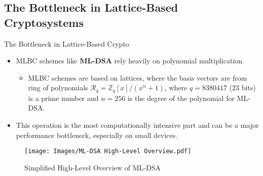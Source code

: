 \documentclass[
	10pt, t,
	hyperref={
		colorlinks,
		citecolor=CtpLatteTeal,
		linkcolor=CtpLatteTeal,
		urlcolor=CtpLatteBlue,
		pdfauthor={Bardia Taghavi},
		pdftitle={LightNTT: A Tiny NTT/iNTT Core for ML-DSA Featuring a Constant-Geometry Pipelined Design},
		pdfsubject={Cryptography},
		pdfkeywords={NTT, iNTT, ML-DSA, Constant-Geometry Pipelined Design},
		pdfcreator={Bardia Taghavi},
		pdfproducer={Bardia Taghavi}
		},
	aspectratio=1610,
	]
	{beamer}
\begin{document}
\subsection{The Bottleneck in Lattice-Based Cryptosystems}
\begin{frame}{The Bottleneck in Lattice-Based Crypto}
	\begin{itemize}\setlength{\itemsep}{2ex}
		\item MLBC schemes like \textbf{ML-DSA} rely heavily on polynomial multiplication.
		\begin{itemize}\vspace{1ex}
			\item MLBC schemes are based on lattices, where the basis vectors are from ring of polynomials $\mathcal{R}_q = \mathbb{Z}_q[x]/(x^n+1)$, where $q = 8380417$ (23 bits) is a prime number and $n = 256$ is the degree of the polynomial for ML-DSA.
		\end{itemize}
		\item This operation is the most computationally intensive part and can be a major performance bottleneck, especially on small devices.

	\end{itemize}
	\begin{figure}
		\texttt{[image: Images/ML-DSA High-Level Overview.pdf]}
		\caption{\textcolor<-1>{FadeOverlay}{Simplified High-Level Overview of ML-DSA}}
	\end{figure}
\end{frame}
\end{document}
